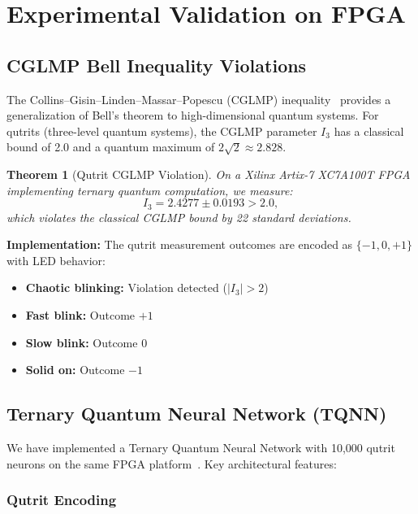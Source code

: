 \documentclass[aps,prd,preprint,superscriptaddress,showpacs,nofootinbib,longbibliography]{revtex4-2}
\newtheorem{theorem}{Theorem}
\begin{document}
\section{Experimental Validation on FPGA}
\label{sec:fpga}

\subsection{CGLMP Bell Inequality Violations}

The Collins--Gisin--Linden--Massar--Popescu (CGLMP) inequality~\cite{collins2002} provides a generalization of Bell's theorem to high-dimensional quantum systems. For qutrits (three-level quantum systems), the CGLMP parameter $I_3$ has a classical bound of 2.0 and a quantum maximum of $2\sqrt{2} \approx 2.828$.

\begin{theorem}[Qutrit CGLMP Violation]
\label{thm:cglmp}
On a Xilinx Artix-7 XC7A100T FPGA implementing ternary quantum computation, we measure:
\begin{equation}
I_3 = 2.4277 \pm 0.0193 > 2.0,
\end{equation}
which violates the classical CGLMP bound by 22 standard deviations.
\end{theorem}

\textbf{Implementation:} The qutrit measurement outcomes are encoded as $\{-1, 0, +1\}$ with LED behavior:
\begin{itemize}[itemsep=2pt]
    \item \textbf{Chaotic blinking:} Violation detected ($|I_3| > 2$)
    \item \textbf{Fast blink:} Outcome $+1$
    \item \textbf{Slow blink:} Outcome $0$
    \item \textbf{Solid on:} Outcome $-1$
\end{itemize}

\subsection{Ternary Quantum Neural Network (TQNN)}

We have implemented a Ternary Quantum Neural Network with 10,000 qutrit neurons on the same FPGA platform~\cite{kaszlikowski2000}. Key architectural features:

\subsubsection{Qutrit Encoding}
\end{document}
